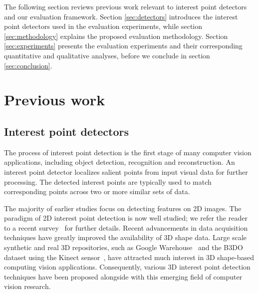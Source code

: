 The following section reviews previous work relevant to interest point detectors and our evaluation framework. Section \ref{sec:detectors} introduces the interest point detectors used in the evaluation experiments, while section \ref{sec:methodology} explains the proposed evaluation methodology.   
Section \ref{sec:experiments} presents the evaluation experiments and their corresponding quantitative and qualitative analyses, before we conclude in section \ref{sec:conclusion}.

\section{Previous work}
\label{sec:previous}

\subsection{Interest point detectors}

The process of interest point detection is the first stage of many computer vision applications, including object detection, recognition and reconstruction. An interest point detector localizes salient points from input visual data for further processing. The detected interest points are typically used to match corresponding points across two or more similar sets of data. 

The majority of earlier studies focus on detecting features on 2D images. The paradigm of 2D interest point detection is now
well studied; we refer the reader to a recent survey~\cite{Tuytelaars2008} for further details. 
Recent advancements in data acquisition techniques have greatly improved the availability of 3D shape data. 
Large scale synthetic and real 3D repositories, such as Google Warehouse~\cite{Lai2010} and the B3DO dataset using the Kinect sensor~\cite{Janoch2011}, have attracted much interest in 3D shape-based computing vision applications. Consequently, various 3D interest point detection techniques have been proposed alongside with this emerging field of computer vision research. 


